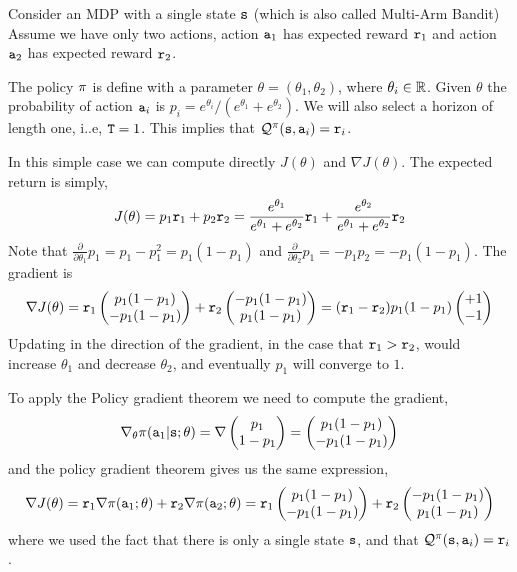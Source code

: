 \begin{example}
Consider an MDP with a single state ${\tt s}$ (which is also called
Multi-Arm Bandit)
Assume we have only two actions, action ${\tt a}_1$ has expected
reward ${\tt r}_1$ and action ${\tt a}_2$ has expected reward
${\tt r}_2$.

The policy $\pi$ is define with a parameter
$\theta=(\theta_1,\theta_2)$, where $\theta_i\in \mathbb{R}$. Given
$\theta$ the probability of action ${\tt a}_i$ is
$p_i=e^{\theta_i}/(e^{\theta_1}+e^{\theta_2})$. We will also select
a horizon of length one, i..e, ${\tt T}=1$. This implies that
$\mathcal{Q}^\pi({\tt s},{\tt a}_i)={\tt r}_i$.

In this simple case we can compute directly $J(\theta)$ and $\nabla
J(\theta)$. The expected return is simply,
\[
J(\theta)=p_1 {\tt r}_1 + p_2 {\tt r}_2 =
\frac{e^{\theta_1}}{e^{\theta_1}+e^{\theta_2}} {\tt r}_1 +
\frac{e^{\theta_2}}{e^{\theta_1}+e^{\theta_2}} {\tt r}_2
\]
Note that $\frac{\partial}{\partial \theta_1} p_1=
p_1-p_1^2=p_1(1-p_1) $ and $\frac{\partial }{\partial \theta_2} p_1=
- p_1 p_2= -p_1(1-p_1)$. The gradient is
\[
\nabla J(\theta)= {\tt r}_1 \begin{pmatrix} p_1(1-p_1)\\
-p_1(1-p_1)\end{pmatrix} + {\tt r}_2 \begin{pmatrix} -p_1(1-p_1)\\
p_1(1-p_1)\end{pmatrix} = ({\tt r}_1-{\tt r}_2) p_1(1-p_1) \begin{pmatrix}+1\\
-1\end{pmatrix}
\]
Updating in the direction of the gradient, in the case that
${\tt r}_1>{\tt r}_2$, would increase $\theta_1$ and decrease
$\theta_2$, and eventually $p_1$ will converge to $1$.

To apply the Policy gradient theorem we need to compute the
gradient,
\[
\nabla_\theta \pi({\tt a}_1|{\tt s};\theta) = \nabla \begin{pmatrix} p_1\\
1-p_1\end{pmatrix}=  \begin{pmatrix} p_1(1-p_1)\\
-p_1(1-p_1)\end{pmatrix}
\]
and the policy gradient theorem gives us the same expression,
\[
\nabla J(\theta) = {\tt r}_1 \nabla
\pi({\tt a}_1;\theta)+{\tt r}_2 \nabla
\pi({\tt a}_2;\theta)={\tt r}_1 \begin{pmatrix} p_1(1-p_1)\\
-p_1(1-p_1)\end{pmatrix} + {\tt r}_2 \begin{pmatrix} -p_1(1-p_1)\\
p_1(1-p_1)\end{pmatrix}
\]
where we used the fact that there is only a single state ${\tt s}$,
and that $\mathcal{Q}^\pi({\tt s},{\tt a}_i)={\tt r}_i$.
\end{example}

